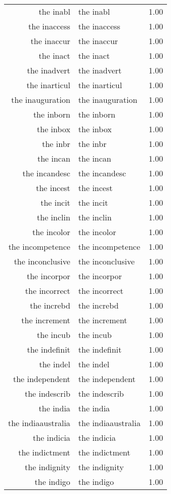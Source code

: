 \begin{table}[ht]
\begin{tabular}{rlr}
  the inabl & the inabl & 1.00 \\ 
  the inaccess & the inaccess & 1.00 \\ 
  the inaccur & the inaccur & 1.00 \\ 
  the inact & the inact & 1.00 \\ 
  the inadvert & the inadvert & 1.00 \\ 
  the inarticul & the inarticul & 1.00 \\ 
  the inauguration & the inauguration & 1.00 \\ 
  the inborn & the inborn & 1.00 \\ 
  the inbox & the inbox & 1.00 \\ 
  the inbr & the inbr & 1.00 \\ 
  the incan & the incan & 1.00 \\ 
  the incandesc & the incandesc & 1.00 \\ 
  the incest & the incest & 1.00 \\ 
  the incit & the incit & 1.00 \\ 
  the inclin & the inclin & 1.00 \\ 
  the incolor & the incolor & 1.00 \\ 
  the incompetence & the incompetence & 1.00 \\ 
  the inconclusive & the inconclusive & 1.00 \\ 
  the incorpor & the incorpor & 1.00 \\ 
  the incorrect & the incorrect & 1.00 \\ 
  the increbd & the increbd & 1.00 \\ 
  the increment & the increment & 1.00 \\ 
  the incub & the incub & 1.00 \\ 
  the indefinit & the indefinit & 1.00 \\ 
  the indel & the indel & 1.00 \\ 
  the independent & the independent & 1.00 \\ 
  the indescrib & the indescrib & 1.00 \\ 
  the india & the india & 1.00 \\ 
  the indiaaustralia & the indiaaustralia & 1.00 \\ 
  the indicia & the indicia & 1.00 \\ 
  the indictment & the indictment & 1.00 \\ 
  the indignity & the indignity & 1.00 \\ 
  the indigo & the indigo & 1.00 \\ 

\end{tabular}
\end{table}
